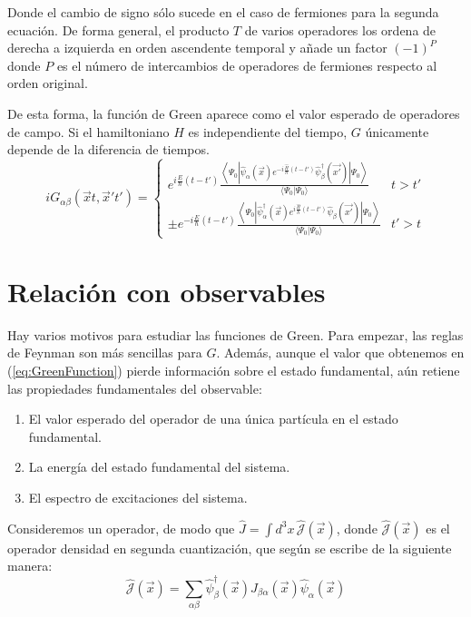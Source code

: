\documentclass{article} %
\begin{document}
Donde el cambio de signo sólo sucede en el caso de fermiones para la segunda ecuación. De forma general, el producto $T$ de varios operadores los ordena de derecha a izquierda en orden ascendente temporal y añade un factor $(-1)^P$ donde $P$ es el número de intercambios de operadores de fermiones respecto al orden original.

De esta forma, la función de Green aparece como el valor esperado de operadores de campo. Si el hamiltoniano $\hat{H}$ es independiente del tiempo, $G$ únicamente depende de la diferencia de tiempos.
$$
iG_{\alpha\beta}(\vec{x}t, \vec{x}'t') = \left\{\begin{array}{cc}
    e^{i\frac{E}{\hbar}(t-t')}\frac{\left\langle\Psi_0\left|\hat{\psi}_{\alpha}(\vec{x})e^{-i\frac{\hat{H}}{\hbar}(t-t')}\hat{\psi}^{\dagger}_{\beta}(\vec{x'})\right|\Psi_0\right\rangle}{\langle\Psi_0|\Psi_0\rangle} & t>t' \\
    \pm e^{-i\frac{E}{\hbar}(t-t')}\frac{\left\langle\Psi_0\left|\hat{\psi}^{\dagger}_{\alpha}(\vec{x})e^{i\frac{\hat{H}}{\hbar}(t-t')}\hat{\psi}_{\beta}(\vec{x'})\right|\Psi_0\right\rangle}{\langle\Psi_0|\Psi_0\rangle} & t'>t
\end{array}\right.
$$

\section{Relación con observables}

Hay varios motivos para estudiar las funciones de Green. Para empezar, las reglas de Feynman son más sencillas para $G$. Además, aunque el valor que obtenemos en (\ref{eq:GreenFunction}) pierde información sobre el estado fundamental, aún retiene las propiedades fundamentales del observable:
\begin{enumerate}
    \item El valor esperado del operador de una única partícula en el estado fundamental.
    \item La energía del estado fundamental del sistema.
    \item El espectro de excitaciones del sistema.
\end{enumerate}

Consideremos un operador, de modo que $\hat{J} = \int d^3x \, \hat{\mathcal{J}}(\vec{x})$, donde $\hat{\mathcal{J}}(\vec{x})$ es el operador densidad en segunda cuantización, que según \cite{luis2024avq} se escribe de la siguiente manera:
\begin{equation}
    \hat{\mathcal{J}}(\vec{x}) = \sum_{\alpha\beta}\hat{\psi}_{\beta}^{\dagger}(\vec{x})J_{\beta\alpha}(\vec{x})\hat{\psi}_{\alpha}(\vec{x})
\end{equation}
\end{document}
